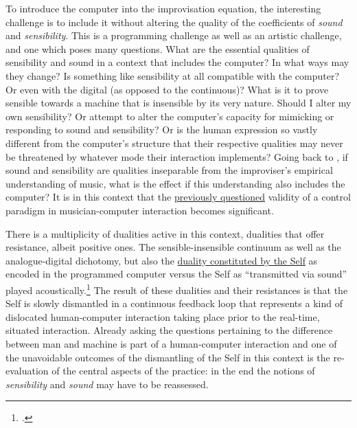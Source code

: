 To introduce the computer into the improvisation equation, the interesting challenge is to include it without altering the quality of the coefficients of \emph{sound} and \emph{sensibility}. This is a programming challenge as well as an artistic challenge, and one which poses many questions. What are the essential qualities of sensibility and sound in a context that includes the computer? In what ways may they change? Is something like sensibility at all compatible with the computer? Or even with the digital (as opposed to the continuous)? What is it to prove sensible towards a machine that is insensible by its very nature. Should I alter my own sensibility? Or attempt to alter the computer's capacity for mimicking or responding to sound and sensibility? Or is the human expression so vastly different from the computer's structure that their respective qualities may never be threatened by whatever mode their interaction implements? Going back to \citeauthor{lewis-1}, if sound and sensibility are qualities inseparable from the improviser's empirical understanding of music, what is the effect if this understanding also includes the computer? It is in this context that the \hyperlink{sec:target:personal-background-3}{previously questioned} validity of a control paradigm in musician-computer interaction becomes significant. 

There is a multiplicity of dualities active in this context, dualities that offer resistance, albeit positive ones. The sensible-insensible continuum as well as the analogue-digital dichotomy, but also the \hyperlink{sec:target:overview-1}{duality constituted by the Self} as encoded in the programmed computer versus the Self as ``transmitted via sound'' played acoustically.\footcite[117]{lewis-1} The result of these dualities and their resistances is that the Self is slowly dismantled in a continuous feedback loop that represents a kind of dislocated human-computer interaction taking place prior to the real-time, situated interaction. Already asking the questions pertaining to the difference between man and machine is part of a human-computer interaction and one of the unavoidable outcomes of the dismantling of the Self in this context is the re-evaluation of the central aspects of the practice: in the end the notions of \emph{sensibility} and \emph{sound} may have to be reassessed.

